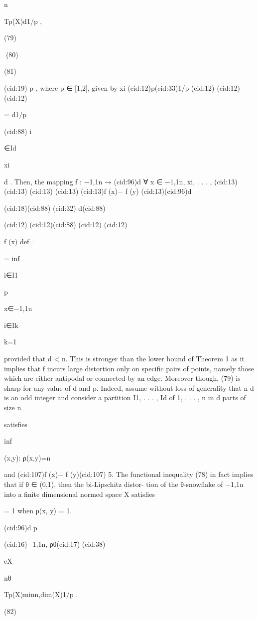 {n

Tp(X)d1/p ,

(79)

(80)

(81)

(cid:19)
p , where p ∈ [1,2], given by
xi
(cid:12)p(cid:33)1/p
(cid:12)
(cid:12)
(cid:12)

= d1/p

(cid:88) i

∈Id

xi

d . Then, the mapping f : {−1,1}n → (cid:96)d
∀ x ∈ {−1,1}n,
xi, . . . ,
(cid:13)
(cid:13)
(cid:13)
(cid:13)
(cid:13)f (x)− f (y)
(cid:13)(cid:96)d

(cid:18)(cid:88)
(cid:32) d(cid:88)

(cid:12)
(cid:12)(cid:88)
(cid:12)
(cid:12)

f (x) def=

= inf

i∈I1

p

x∈{−1,1}n

i∈Ik

k=1

provided that d < n. This is stronger than the lower bound of Theorem 1 as it implies that f
incurs large distortion only on speciﬁc pairs of points, namely those which are either antipodal
or connected by an edge. Moreover though, (79) is sharp for any value of d and p. Indeed,
assume without loss of generality that n
d is an odd integer and consider a partition I1, . . . , Id of
{1, . . . , n} in d parts of size n

satisﬁes

inf

(x,y): ρ(x,y)=n

and (cid:107)f (x)− f (y)(cid:107)
5. The functional inequality (78) in fact implies that if θ ∈ (0,1), then the bi-Lipschitz distor-
tion of the θ-snowﬂake of {−1,1}n into a ﬁnite dimensional normed space X satisﬁes

= 1 when ρ(x, y) = 1.

(cid:96)d
p

(cid:16){−1,1}n, ρθ(cid:17) (cid:38)

cX

nθ

Tp(X)min{n,dim(X)}1/p .

(82)

}
